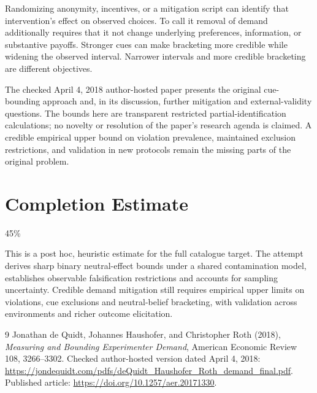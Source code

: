 \documentclass[11pt]{article}
\begin{document}
Randomizing anonymity, incentives, or a mitigation script can identify
that intervention's effect on observed choices. To call it removal of
demand additionally requires that it not change underlying preferences,
information, or substantive payoffs. Stronger cues can make bracketing
more credible while widening the observed interval. Narrower intervals
and more credible bracketing are different objectives.

The checked April 4, 2018 author-hosted paper presents the original
cue-bounding approach and, in its discussion, further mitigation and
external-validity questions. The bounds here are transparent restricted
partial-identification calculations; no novelty or resolution of the
paper's research agenda is claimed. A credible empirical upper bound on
violation prevalence, maintained exclusion restrictions, and validation in
new protocols remain the missing parts of the original problem.

\section{Completion Estimate}
45\%

This is a post hoc, heuristic estimate for the full catalogue target.
The attempt derives sharp binary neutral-effect bounds under a shared contamination model, establishes observable falsification restrictions and accounts for sampling uncertainty. Credible demand mitigation still requires empirical upper limits on violations, cue exclusions and neutral-belief bracketing, with validation across environments and richer outcome elicitation.

\begin{thebibliography}{9}
 Jonathan de Quidt, Johannes Haushofer, and Christopher Roth
(2018), \emph{Measuring and Bounding Experimenter Demand}, American
Economic Review 108, 3266--3302. Checked author-hosted version dated
April 4, 2018:
\url{https://jondequidt.com/pdfs/deQuidt_Haushofer_Roth_demand_final.pdf}.
Published article: \url{https://doi.org/10.1257/aer.20171330}.
\end{thebibliography}
\end{document}
